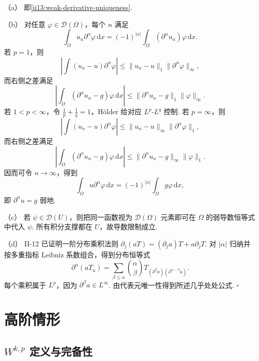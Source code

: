 \begin{FAProof}
（a） 即\autoref{ii13:weak-derivative-uniqueness}.

（b） 对任意 \(\displaystyle\varphi\in\mathcal D(\Omega)\)，每个 \(\displaystyle n\) 满足
\[
\int_\Omega u_n\partial^\alpha\varphi\,\mathrm{d}x
=
(-1)^{|\alpha|}
\int_\Omega(\partial^\alpha u_n)\varphi\,\mathrm{d}x.
\]
若 \(\displaystyle p=1\)，则
\[
\left|\int(u_n-u)\partial^\alpha\varphi\right|
\leqslant
\|u_n-u\|_1\|\partial^\alpha\varphi\|_\infty,
\]
而右侧之差满足
\[
\left|\int_\Omega(\partial^\alpha u_n-g)\varphi\,\mathrm{d}x\right|
\leqslant
\|\partial^\alpha u_n-g\|_1\|\varphi\|_\infty.
\]
若 \(\displaystyle1<p<\infty\)，令 \(\displaystyle\frac{1}{p}+\frac{1}{q}=1\)，Hölder 给对应 \(\displaystyle L^p\)-\(\displaystyle L^q\) 控制. 若 \(\displaystyle p=\infty\)，则
\[
\left|\int(u_n-u)\partial^\alpha\varphi\right|
\leqslant
\|u_n-u\|_\infty\|\partial^\alpha\varphi\|_1,
\]
而右侧之差满足
\[
\left|\int_\Omega(\partial^\alpha u_n-g)\varphi\,\mathrm{d}x\right|
\leqslant
\|\partial^\alpha u_n-g\|_\infty\|\varphi\|_1.
\]
因而可令 \(\displaystyle n\to\infty\)，得到
\[
\int_\Omega u\partial^\alpha\varphi\,\mathrm{d}x
=
(-1)^{|\alpha|}
\int_\Omega g\varphi\,\mathrm{d}x,
\]
即 \(\displaystyle\partial^\alpha u=g\) 弱地.

（c） 若 \(\displaystyle\psi\in\mathcal D(U)\)，则把同一函数视为 \(\displaystyle\mathcal D(\Omega)\) 元素即可在 \(\displaystyle\Omega\) 的弱导数恒等式中代入 \(\displaystyle\psi\). 所有积分支撑都在 \(\displaystyle U\)，故导数限制成立.

（d） II-12 已证明一阶分布乘积法则 \(\displaystyle \partial_j(aT) =(\partial_ja)T+a\partial_jT.\)
对 \(\displaystyle|\alpha|\) 归纳并按多重指标 Leibniz 系数组合，得到分布恒等式
\[
\partial^\alpha(aT_u)
=
\sum_{\beta\leqslant\alpha}
\binom{\alpha}{\beta}
T_{(\partial^\beta a)(\partial^{\alpha-\beta}u)}.
\]
每个乘积属于 \(\displaystyle L^p\)，因为 \(\displaystyle\partial^\beta a\in L^\infty\). 由代表元唯一性得到所述几乎处处公式.
\hfill\(\square\)
\end{FAProof}

\section{高阶情形}\label{sec:ii13-higher-order}

\subsection{\texorpdfstring{\(\displaystyle W^{k,p}\)}{Wkp} 定义与完备性}

